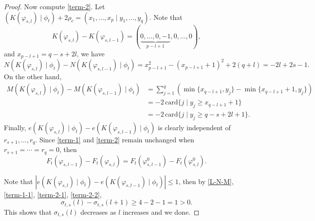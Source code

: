\documentclass[10pt,a4paper]{amsart}
\begin{document}
\begin{proof}
	Now compute \eqref{term-2}. Let $(K(\varphi_{s,l})\mid \phi_t)+2\rho_c=(x_1,\dots,x_p\mid y_1,\dots,y_q)$. Note that
	\[K(\varphi_{s,l})-K(\varphi_{s,l-1})=(\underbrace{0,\dots,0,-1}_{p-l+1},0,\dots,0),\]
	and $x_{p-l+1}=q-s+2l$, we have
	\begin{equation}\label{term-2-1}
		N(K(\varphi_{s,l})\mid \phi_t)-N(K(\varphi_{s,l-1})\mid \phi_t)=x_{p-l+1}^2-(x_{p-l+1}+1)^2+2(q+l)=-2l+2s-1.
	\end{equation}
On the other hand,
\begin{equation}\label{term-2-2}
	\begin{split}
	M(K(\varphi_{s,l})\mid \phi_t)-M(K(\varphi_{s,l-1})\mid\phi_t)&=\sum_{j=1}^q(\min\{x_{q-l+1},y_j\}-\min\{x_{q-l+1}+1,y_j\})\\
	&=-2\,\mathrm{card}\{j\mid y_j\ge x_{q-l+1}+1\}\\
	&=-2\, \mathrm{card}\{j\mid y_j\ge q-s+2l+1\}.
	\end{split}
\end{equation}
Finally, $e(K(\varphi_{s,l})\mid \phi_t)-e(K(\varphi_{s,l-1})\mid\phi_t)$ is clearly independent of $r_{s+1},\dots,r_q$. Since \eqref{term-1} and \eqref{term-2} remain unchanged when $r_{s+1}=\cdots=r_q=0$, then
\[F_t(\varphi_{s,l-1})-F_t(\varphi_{s,l})=F_t(\varphi_{s,l-1}^0)-F_t(\varphi_{s,l}^0).\]

Note that $|e(K(\varphi_{s,l})\mid \phi_t)-e(K(\varphi_{s,l-1})\mid \phi_t)|\le 1$, then by \eqref{L-N-M}, \eqref{term-1-1}, \eqref{term-2-1}, \eqref{term-2-2},
\[\sigma_{t,s}(l)-\sigma_{t,s}(l+1)\ge 4-2-1=1>0.\]
This shows that $\sigma_{t,s}(l)$ decreases as $l$ increases and we done.
\end{proof}
\end{document}
